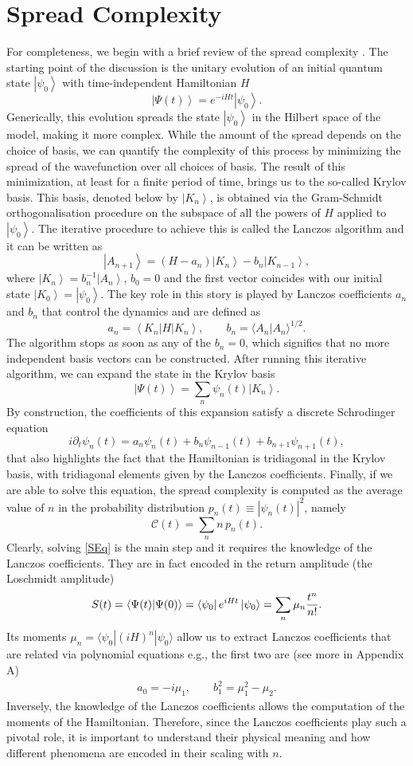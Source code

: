 \documentclass[aps,prl,twocolumn,showpacs,preprintnumbers,amsmath,amssymb]{revtex4-1}
\def\frac#1#2{{#1\over #2}}
\def\be{\begin{equation}}
\def\ee{\end{equation}}
\newcommand{\bea}{\begin{eqnarray}}
\newcommand{\eea}{\end{eqnarray}}
\newcommand{\ket}[1]{\left| #1 \right>}
\newcommand{\bra}[1]{\left< #1 \right|}
\begin{document}
\section*{Spread Complexity}
For completeness, we begin with a brief review of the spread complexity  \cite{Balasubramanian:2022tpr}. The starting point of the discussion is the unitary evolution of an initial quantum state $\ket{\psi_0}$ with time-independent Hamiltonian $H$
\be
\ket{\Psi(t)}=e^{-iHt}\ket{\psi_0}.\label{InState}
\ee
Generically, this evolution spreads the state $\ket{\psi_0}$ in the Hilbert space of the model, making it more complex. While the amount of the spread depends on the choice of basis, we can quantify the complexity of this process by minimizing the spread of the wavefunction over all choices of basis. The result of this minimization, at least for a finite period of time, brings us to the so-called Krylov basis. This basis, denoted below by $\ket{K_n}$, is obtained via the Gram-Schmidt orthogonalisation procedure on the subspace of all the powers of $H$ applied to $\ket{\psi_0}$. The iterative procedure to achieve this is called the Lanczos algorithm \cite{LanczosVish} and it can be written as
\be
\ket{A_{n+1}}=(H-a_n)\ket{K_n}-b_n\ket{K_{n-1}},
\ee 
where $\ket{K_n}=b^{-1}_n\ket{A_n}$, $b_0=0$ and the first vector coincides with our initial state $\ket{K_0}=\ket{\psi_0}$. The key role in this story is played by Lanczos coefficients $a_n$ and $b_n$ that control the  dynamics and are defined as
\be
a_n=\bra{K_n}H\ket{K_n},\qquad b_n=\langle A_n|A_n\rangle^{1/2}.\label{LanczCoeffDeff}
\ee
The algorithm stops as soon as any of the $b_n=0$, which signifies that no more independent basis vectors can be constructed. After running this iterative algorithm, we can expand the state in the Krylov basis
\be\label{expand}
\ket{\Psi(t)}=\sum_n \psi_n(t)\ket{K_n}.
\ee
By construction, the coefficients of this expansion satisfy a discrete Schrodinger equation
\be
i\partial_t\psi_n(t)=a_n\psi_n(t)+b_n\psi_{n-1}(t)+b_{n+1}\psi_{n+1}(t),\label{SEq}
\ee
that also highlights the fact that the Hamiltonian is tridiagonal in the Krylov basis, with tridiagonal elements given by the Lanczos coefficients. Finally, if we are able to solve this equation, the spread complexity is computed as the average value of $n$ in the probability distribution $p_n(t)\equiv|\psi_n(t)|^2$, namely
\be
\mathcal{C}(t)=\sum_{n}n\,p_n(t).\label{SpreadC}
\ee
Clearly, solving \eqref{SEq} is the main step and it requires the knowledge of the Lanczos coefficients. They are in fact encoded in the return amplitude (the Loschmidt amplitude)
\be
S(t)=\langle \Psi(t)|\Psi(0)\rangle=\bra{\psi_0}e^{iHt}\ket{\psi_0}=\sum_n\mu_n\frac{t^n}{n!}.\label{Moments}
\ee
Its moments $\mu_n=\langle \psi_0|(iH)^n|\psi_0\rangle$ allow us to extract Lanczos coefficients that are related via polynomial equations e.g., the first two are (see more in Appendix A)
\bea
a_0=-i\mu_1,\qquad b^2_1=\mu^2_1-\mu_2.
\label{abmus}
\eea
Inversely, the knowledge of the Lanczos coefficients allows the computation of the moments of the Hamiltonian. Therefore, since the Lanczos coefficients play such a pivotal role, it is important to understand their physical meaning and how different phenomena are encoded in their scaling with $n$.
\end{document}
